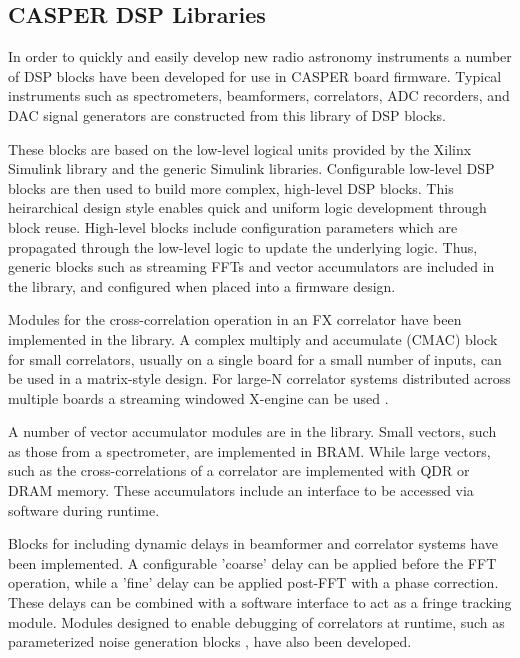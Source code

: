 \documentclass{ws-jai}
\begin{document}
\subsection{CASPER DSP Libraries} \label{sec:libraries}



In order to quickly and easily develop new radio astronomy instruments a number
of DSP blocks have been developed for use in CASPER board firmware. Typical
instruments such as spectrometers, beamformers, correlators, ADC recorders, and
DAC signal generators are constructed from this library of DSP blocks.

These blocks are based on the low-level logical units provided by the Xilinx
Simulink library and the generic Simulink libraries. Configurable low-level DSP
blocks are then used to build more complex, high-level DSP blocks. This
heirarchical design style enables quick and uniform logic development through
block reuse. High-level blocks include configuration parameters which are
propagated through the low-level logic to update the underlying logic. Thus,
generic blocks such as streaming FFTs and vector accumulators are included in
the library, and configured when placed into a firmware design.

Modules for the cross-correlation operation in an FX correlator have been
implemented in the library. A complex multiply and accumulate (CMAC) block for
small correlators, usually on a single board for a small number of inputs, can
be used in a matrix-style design. For large-N correlator systems distributed
across multiple boards a streaming windowed X-engine can be used \citep{parsons2008scalable, hickish14}.

A number of vector accumulator modules are in the library.
Small vectors, such as those from a spectrometer, are implemented in BRAM. While
large vectors, such as the cross-correlations of a correlator are implemented
with QDR or DRAM memory. These accumulators include an interface to be accessed
via software during runtime.

Blocks for including dynamic delays in beamformer and correlator systems have
been implemented. A configurable 'coarse' delay can be applied before the FFT
operation, while a 'fine' delay can be applied post-FFT with a phase correction.
These delays can be combined with a software interface to act as a fringe
tracking module. Modules designed to enable debugging of correlators at runtime,
such as parameterized noise generation blocks \citep{noisegen}, have also been developed.
\end{document}
